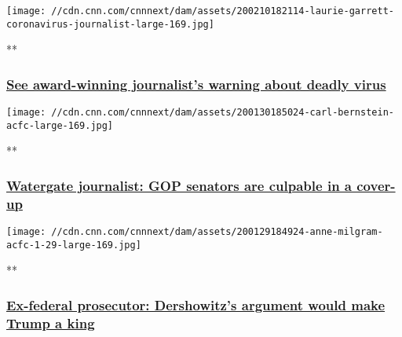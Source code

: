 \href{/videos/world/2020/02/10/coronavirus-quarantine-cruise-ship-acfc-full-episode-vpx.cnn/video/playlists/acfc-full-episodes/}{}

\texttt{[image: //cdn.cnn.com/cnnnext/dam/assets/200210182114-laurie-garrett-coronavirus-journalist-large-169.jpg]}

**

\hypertarget{see-award-winning-journalists-warning-about-deadly-virus}{%
\subsubsection{\texorpdfstring{\href{/videos/world/2020/02/10/coronavirus-quarantine-cruise-ship-acfc-full-episode-vpx.cnn/video/playlists/acfc-full-episodes/}{See
award-winning journalist's warning about deadly
virus}}{See award-winning journalist's warning about deadly virus}}\label{see-award-winning-journalists-warning-about-deadly-virus}}

\href{/videos/politics/2020/01/30/carl-bernstein-trump-impeachment-trial-senate-questions-acfc-full-episode-vpx.cnn/video/playlists/acfc-full-episodes/}{}

\texttt{[image: //cdn.cnn.com/cnnnext/dam/assets/200130185024-carl-bernstein-acfc-large-169.jpg]}

**

\hypertarget{watergate-journalist-gop-senators-are-culpable-in-a-cover-up-}{%
\subsubsection{\texorpdfstring{\href{/videos/politics/2020/01/30/carl-bernstein-trump-impeachment-trial-senate-questions-acfc-full-episode-vpx.cnn/video/playlists/acfc-full-episodes/}{Watergate
journalist: GOP senators are culpable in a cover-up
}}{Watergate journalist: GOP senators are culpable in a cover-up }}\label{watergate-journalist-gop-senators-are-culpable-in-a-cover-up-}}

\href{/videos/politics/2020/01/29/anne-milgram-trump-impeachment-trial-senate-questions-acfc-full-episode-vpx.cnn/video/playlists/acfc-full-episodes/}{}

\texttt{[image: //cdn.cnn.com/cnnnext/dam/assets/200129184924-anne-milgram-acfc-1-29-large-169.jpg]}

**

\hypertarget{ex-federal-prosecutor-dershowitzs-argument-would-make-trump-a-king}{%
\subsubsection{\texorpdfstring{\href{/videos/politics/2020/01/29/anne-milgram-trump-impeachment-trial-senate-questions-acfc-full-episode-vpx.cnn/video/playlists/acfc-full-episodes/}{Ex-federal
prosecutor: Dershowitz's argument would make Trump a
king}}{Ex-federal prosecutor: Dershowitz's argument would make Trump a king}}\label{ex-federal-prosecutor-dershowitzs-argument-would-make-trump-a-king}}

